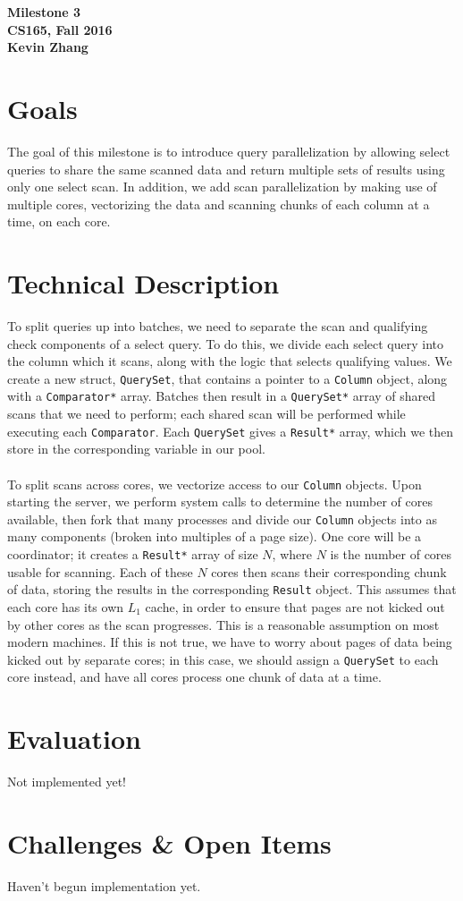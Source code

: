 \documentclass[12pt]{article}
\newcommand{\code}{\texttt}
\begin{document}
\begin{center}
\textbf{Milestone 3 \\ CS165, Fall 2016 \\ Kevin Zhang}
\end{center}

\section{Goals}
The goal of this milestone is to introduce query parallelization by allowing select queries to share the same scanned data and return multiple sets of results using only one select scan.  In addition, we add scan parallelization by making use of multiple cores, vectorizing the data and scanning chunks of each column at a time, on each core.

\section{Technical Description}
To split queries up into batches, we need to separate the scan and qualifying check components of a select query.  To do this, we divide each select query into the column which it scans, along with the logic that selects qualifying values.  We create a new struct, \code{QuerySet}, that contains a pointer to a \code{Column} object, along with a \code{Comparator*} array.  Batches then result in a \code{QuerySet*} array of shared scans that we need to perform; each shared scan will be performed while executing each \code{Comparator}.  Each \code{QuerySet} gives a \code{Result*} array, which we then store in the corresponding variable in our pool.
\\\\To split scans across cores, we vectorize access to our \code{Column} objects.  Upon starting the server, we perform system calls to determine the number of cores available, then fork that many processes and divide our \code{Column} objects into as many components (broken into multiples of a page size).  One core will be a coordinator; it creates a \code{Result*} array of size $N$, where $N$ is the number of cores usable for scanning.  Each of these $N$ cores then scans their corresponding chunk of data, storing the results in the corresponding \code{Result} object.  This assumes that each core has its own $L_1$ cache, in order to ensure that pages are not kicked out by other cores as the scan progresses.  This is a reasonable assumption on most modern machines.  If this is not true, we have to worry about pages of data being kicked out by separate cores; in this case, we should assign a \code{QuerySet} to each core instead, and have all cores process one chunk of data at a time.

\section{Evaluation}
Not implemented yet!

\section{Challenges \& Open Items}
Haven't begun implementation yet.
\end{document}
